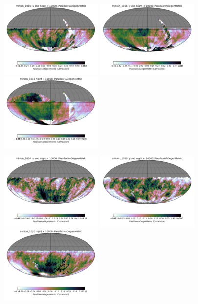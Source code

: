 \begin{figure}[ht]
  \begin{center}
  \includegraphics[width=2.0in]{./figs/milkyway/astromPanels/MW_Astrom_paDegen_Baseline_u_map.png}
  \includegraphics[width=2.0in]{./figs/milkyway/astromPanels/MW_Astrom_paDegen_Baseline_y_map.png}
  \includegraphics[width=2.0in]{./figs/milkyway/astromPanels/MW_Astrom_paDegen_Baseline_10y_map.png}
  \end{center}
  \begin{center}
  \includegraphics[width=2.0in]{./figs/milkyway/astromPanels/MW_Astrom_paDegen_PanSTARRS_u_map.png}
  \includegraphics[width=2.0in]{./figs/milkyway/astromPanels/MW_Astrom_paDegen_PanSTARRS_y_map.png}
  \includegraphics[width=2.0in]{./figs/milkyway/astromPanels/MW_Astrom_paDegen_PanSTARRS_10y_map.png}
  \end{center}


\end{figure}
